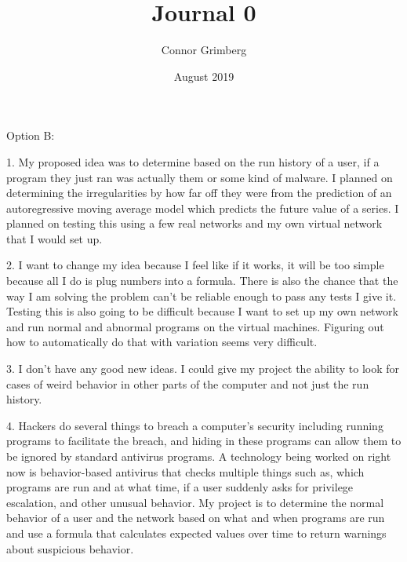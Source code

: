 \documentclass{article}
\title{Journal 0}
\author{Connor Grimberg}
\date{August 2019}
\begin{document}
\maketitle


Option B:

1. My proposed idea was to determine based on the run history of a user, if a program they just ran was actually them or some kind of malware. I planned on determining the irregularities by how far off they were from the prediction of an autoregressive moving average model which predicts the future value of a series. I planned on testing this using a few real networks and my own virtual network that I would set up.

2. I want to change my idea because I feel like if it works, it will be too simple because all I do is plug numbers into a formula. There is also the chance that the way I am solving the problem can't be reliable enough to pass any tests I give it. Testing this is also going to be difficult because I want to set up my own network and run normal and abnormal programs on the virtual machines. Figuring out how to automatically do that with variation seems very difficult. 

3. I don't have any good new ideas. I could give my project the ability to look for cases of weird behavior in other parts of the computer and not just the run history. 

4. Hackers do several things to breach a computer's security including running programs to facilitate the breach, and hiding in these programs can allow them to be ignored by standard antivirus programs. A technology being worked on right now is behavior-based antivirus that checks multiple things such as, which programs are run and at what time, if a user suddenly asks for privilege escalation, and other unusual behavior. My project is to determine the normal behavior of a user and the network based on what and when programs are run and use a formula that calculates expected values over time to return warnings about suspicious behavior.
\end{document}
